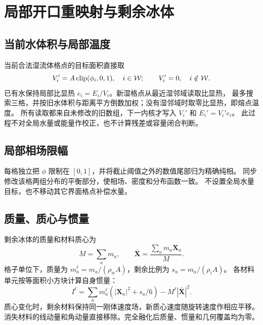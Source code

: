 \section{局部开口重映射与剩余冰体}
\label{sec:remap}
\subsection{当前水体积与局部温度}
当前合法湿流体格点的目标面积直接取
\begin{equation}
 V_i'=A\operatorname{clip}(\phi_i,0,1),\quad i\in\mathcal W;
 \qquad V_i'=0,\quad i\notin\mathcal W.
\end{equation}
已有水保持局部比显热 $e_i=E_i/V_i$。新湿格点从最近湿邻域读取比显热，
最多搜索三格，并按旧水体积与距离平方倒数加权；没有湿邻域时取零比显热，即熔点温度。
所有读取都来自未修改的旧数组，下一内核才写入 $V_i'$ 和 $E_i'=V_i'e_i$。
此过程不对全局水量或能量作校正，也不计算残差或容量闭合判断。


\subsection{局部相场限幅}
每格独立把 $\phi$ 限制在 $[0,1]$，并将截止阈值之外的数值尾部归为精确纯相。
同步修改该格两组分布的平衡部分，使相场、密度和分布函数一致。
不设置全局水量目标，也不移动其它界面格点补偿水量。

\subsection{质量、质心与惯量}
\label{sec:constraints}
剩余冰体的质量和材料质心为
\begin{equation}
 M=\sum_a m_a,\qquad \bar{\bm X}=\frac{\sum_a m_a\bm X_a}{M}.
\end{equation}
格子单位下，质量为 $m_a^\ell=m_a/(\rho_wA)$，剩余比例为 $s_a=m_a/(\rho_iA)$。
各材料单元按等面积小方块计算自身惯量：
\begin{equation}
 I^\ell=\sum_a m_a^\ell\left(|\bm X_a|^2+s_a/6\right)
       -M^\ell|\bar{\bm X}|^2.
\end{equation}
质心变化时，剩余材料保持同一刚体速度场，新质心速度随旋转速度作相应平移。
消失材料的线动量和角动量直接移除。完全融化后质量、惯量和几何覆盖均为零。
